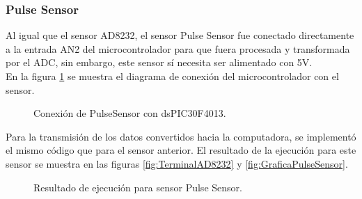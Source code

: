 	
\subsubsection{Pulse Sensor}	
Al igual que el sensor AD8232, el sensor Pulse Sensor fue conectado directamente a la entrada AN2 del microcontrolador para que fuera procesada y transformada por el ADC, sin embargo, este sensor sí necesita ser alimentado con 5V.\\

En la figura \ref{fig:ConexionPulseSensor} se muestra el diagrama de conexión del microcontrolador con el sensor.\\
	
	\begin{figure}[htbp!]
		\centering
		\caption{Conexión de PulseSensor con dsPIC30F4013.}
		\label{fig:ConexionPulseSensor}
	\end{figure}

Para la transmisión de los datos convertidos hacia la computadora, se implementó el mismo código que para el sensor anterior. El resultado de la ejecución para este sensor se muestra en las figuras \ref{fig:TerminalAD8232} y \ref{fig:GraficaPulseSensor}.
	
	\begin{figure}[htbp!]
		\centering
		\caption{Resultado de ejecución para sensor Pulse Sensor.}
		\label{fig:TerminalPulseSensor}
	\end{figure}
	
